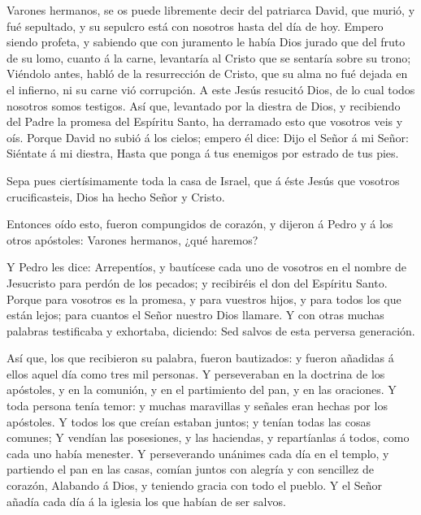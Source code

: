  Varones hermanos, se os puede libremente decir del
patriarca David, que murió, y fué sepultado, y su sepulcro está con
nosotros hasta del día de hoy.  Empero siendo profeta, y
sabiendo que con juramento le había Dios jurado que del fruto de su
lomo, cuanto á la carne, levantaría al Cristo que se sentaría sobre su
trono;  Viéndolo antes, habló de la resurrección de Cristo,
que su alma no fué dejada en el infierno, ni su carne vió corrupción.
 A este Jesús resucitó Dios, de lo cual todos nosotros
somos testigos.  Así que, levantado por la diestra de Dios,
y recibiendo del Padre la promesa del Espíritu Santo, ha derramado esto
que vosotros veis y oís.  Porque David no subió á los
cielos; empero él dice: Dijo el Señor á mi Señor: Siéntate á mi diestra,
 Hasta que ponga á tus enemigos por estrado de tus pies.

 Sepa pues ciertísimamente toda la casa de Israel, que á
éste Jesús que vosotros crucificasteis, Dios ha hecho Señor y Cristo.

 Entonces oído esto, fueron compungidos de corazón, y
dijeron á Pedro y á los otros apóstoles: Varones hermanos, ¿qué haremos?

 Y Pedro les dice: Arrepentíos, y bautícese cada uno de
vosotros en el nombre de Jesucristo para perdón de los pecados; y
recibiréis el don del Espíritu Santo.  Porque para vosotros
es la promesa, y para vuestros hijos, y para todos los que están lejos;
para cuantos el Señor nuestro Dios llamare.  Y con otras
muchas palabras testificaba y exhortaba, diciendo: Sed salvos de esta
perversa generación.

 Así que, los que recibieron su palabra, fueron bautizados:
y fueron añadidas á ellos aquel día como tres mil personas.
 Y perseveraban en la doctrina de los apóstoles, y en la
comunión, y en el partimiento del pan, y en las oraciones. 
Y toda persona tenía temor: y muchas maravillas y señales eran hechas
por los apóstoles.  Y todos los que creían estaban juntos;
y tenían todas las cosas comunes;  Y vendían las
posesiones, y las haciendas, y repartíanlas á todos, como cada uno había
menester.  Y perseverando unánimes cada día en el templo, y
partiendo el pan en las casas, comían juntos con alegría y con sencillez
de corazón,  Alabando á Dios, y teniendo gracia con todo el
pueblo. Y el Señor añadía cada día á la iglesia los que habían de ser
salvos.

